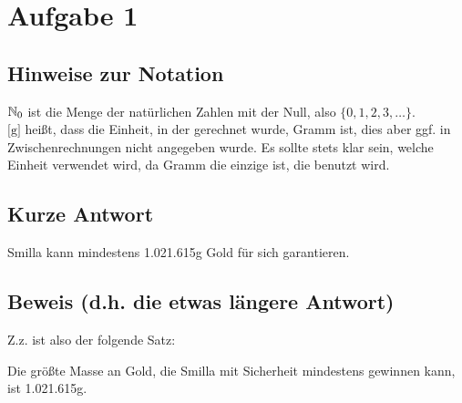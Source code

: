 \section{Aufgabe 1}

\subsection*{Hinweise zur Notation}

$\mathbb{N}_0$ ist die Menge der natürlichen Zahlen mit der Null, also $\{ 0, 1, 2, 3, \ldots \}$.\\
$\text{[g]}$ heißt, dass die Einheit, in der gerechnet wurde, Gramm ist, dies aber ggf. in Zwischenrechnungen nicht 
angegeben wurde. Es sollte stets klar sein, welche Einheit verwendet wird, da Gramm die einzige ist, die benutzt wird.\\


\subsection*{Kurze Antwort}

Smilla kann mindestens 1.021.615g Gold für sich garantieren.

\subsection*{Beweis (d.h. die etwas längere Antwort)}

Z.z. ist also der folgende Satz:
\begin{thm}
    Die größte Masse an Gold, die Smilla mit Sicherheit mindestens gewinnen kann, ist 1.021.615g.
\end{thm}

